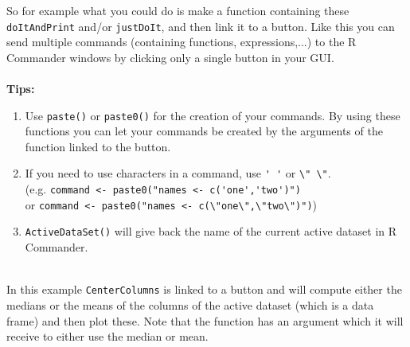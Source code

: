 \documentclass[a4paper]{article}\usepackage[]{graphicx}\usepackage[]{color}
\begin{document}
\noindent So for example what you could do is make a function containing these
\verb|doItAndPrint| and/or \verb|justDoIt|, and then link it to a button. Like
this you can send multiple commands (containing functions, expressions,...) to
the R Commander windows by clicking only a single button in your GUI.
\\ \\
{\bf Tips:}
\begin{enumerate}
\item Use \verb|paste()| or \verb|paste0()| for the creation of your
commands. By using these functions you can let your commands be created by the
arguments of the function linked to the button.
\item If you need to use characters in a command, use \verb|' '| or \verb|\" \"|.\\
(e.g. \verb|command <- paste0("names <- c('one','two')")| \\
or \verb|command <- paste0("names <- c(\"one\",\"two\")")|)
\item \verb|ActiveDataSet()| will give back the name of the current active dataset in
R Commander.
\end{enumerate}

\\
In this example \verb|CenterColumns| is linked to a button and will compute
either the medians or the means of the columns of the active dataset (which is a
data frame) and then plot these. Note that the function has an argument which it will receive to
either use the median or mean.
\end{document}

